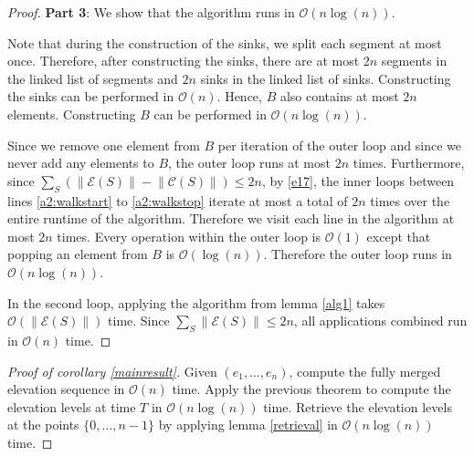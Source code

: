 \documentclass[11pt,a4paper]{article}
\newcommand{\norm}[1]{\left\lVert #1 \right\rVert}
\newcommand{\bO}{\mathcal{O}}
\begin{document}
\begin{proof}
\textbf{Part 3}: We show that the algorithm runs in $\bO(n\log(n))$.

Note that during the construction of the sinks, we split each segment at most once.
Therefore, after constructing the sinks, there are at most $2n$ segments in the linked list of segments and $2n$ sinks in the linked list of sinks.
Constructing the sinks can be performed in $\bO(n)$.
Hence, $B$ also contains at most $2n$ elements.
Constructing $B$ can be performed in $\bO(n\log(n))$.

Since we remove one element from $B$ per iteration of the outer loop and since we never add any elements to $B$, the outer loop runs at most $2n$ times.
Furthermore, since $\sum_S\left(\norm{\mathcal{E}(S)} - \norm{\mathcal{C}(S)}\right) \le 2n$, by \ref{e17}, the inner loops between lines \ref{a2:walkstart} to \ref{a2:walkstop} iterate at most a total of $2n$ times over the entire runtime of the algorithm.
Therefore we visit each line in the algorithm at most $2n$ times.
Every operation within the outer loop is $\bO(1)$ except that popping an element from $B$ is $\bO(\log(n))$.
Therefore the outer loop runs in $\bO(n\log(n))$.

In the second loop, applying the algorithm from lemma \ref{alg1} takes $\bO(\norm{\mathcal{E}(S)})$ time.
Since $\sum_S\norm{\mathcal{E}(S)}\le 2n$, all applications combined run in $\bO(n)$ time.
\end{proof}

\begin{proof}[Proof of corollary \ref{mainresult}] 
Given $(e_1,\ldots,e_n)$, compute the fully merged elevation sequence in $\bO(n)$ time.
Apply the previous theorem to compute the elevation levels at time $T$ in $\bO(n\log(n))$ time.
Retrieve the elevation levels at the points $\{0,\ldots,n-1\}$ by applying lemma \ref{retrieval} in $\bO(n\log(n))$ time.
\end{proof}
\end{document}

